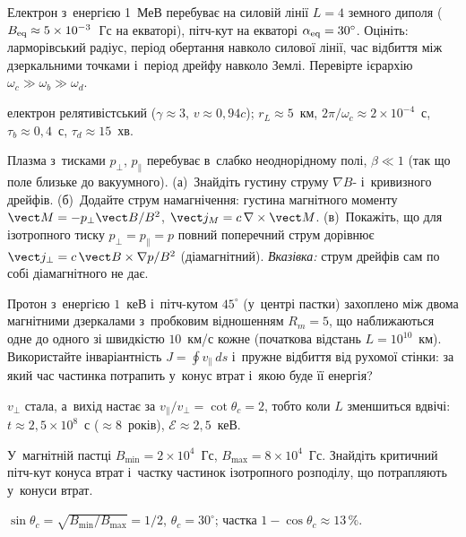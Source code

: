 \begin{problem}\label{prb:DipoleBelts}
	Електрон з~енергією 1~МеВ перебуває на силовій лінії $L=4$ земного диполя ($B_{\rm eq}\approx5\times10^{-3}$~Гс на екваторі),
	пітч-кут на екваторі $\alpha_{\rm eq}=30^\circ$. Оцініть: ларморівський радіус, період обертання
	навколо силової лінії, час відбиття між дзеркальними точками і~період дрейфу навколо Землі.
	Перевірте ієрархію $\omega_c\gg\omega_b\gg\omega_d$.
	\begin{solution}
		електрон релятивістський ($\gamma\approx3$, $v\approx0{,}94c$); $r_L\approx5$~км,
	$2\pi/\omega_c\approx2\times10^{-4}$~с, $\tau_b\approx0{,}4$~с, $\tau_d\approx15$~хв.
	\end{solution}
\end{problem}

\begin{problem}\label{prb:DriftCurrent}
	Плазма з~тисками $p_\perp$, $p_\parallel$ перебуває в~слабко неоднорідному полі, $\beta\ll1$
	(так що поле близьке до вакуумного). (а)~Знайдіть густину струму $\nabla B$- і~кривизного дрейфів.
	(б)~Додайте струм намагнічення: густина магнітного моменту $\vect M=-p_\perp\vect B/B^2$,
	$\vect j_M=c\,\nabla\times\vect M$. (в)~Покажіть, що для ізотропного тиску $p_\perp=p_\parallel=p$
	повний поперечний струм дорівнює $\vect j_\perp=c\,\vect B\times\nabla p/B^2$ (діамагнітний).
	\emph{Вказівка:} струм дрейфів сам по собі діамагнітного не дає.
\end{problem}

\begin{problem}\label{prb:FermiAcceleration}
	Протон з~енергією $1$~кеВ і~пітч-кутом $45^\circ$ (у~центрі пастки) захоплено між двома магнітними дзеркалами з~пробковим відношенням $R_m=5$,
	що наближаються одне до одного зі швидкістю $10$~км/с кожне (початкова відстань $L=10^{10}$~км).
	Використайте інваріантність $J=\oint v_\parallel\,ds$ і~пружне відбиття від рухомої стінки: за який час частинка потрапить у~конус втрат
	і~якою буде її енергія?
	\begin{solution}
		$v_\perp$ стала, а~вихід настає за $v_\parallel/v_\perp=\cot\theta_c=2$, тобто коли $L$ зменшиться вдвічі:
	$t\approx2{,}5\times10^8$~с ($\approx8$~років), $\mathcal E\approx2{,}5$~кеВ.
	\end{solution}
\end{problem}

\begin{problem}\label{prb:PlasmaMirror}
	У~магнітній пастці $B_{\min}=2\times10^4$~Гс, $B_{\max}=8\times10^4$~Гс. Знайдіть
	критичний пітч-кут конуса втрат і~частку частинок ізотропного розподілу, що
	потрапляють у~конуси втрат.
	\begin{solution}
		$\sin\theta_c=\sqrt{B_{\min}/B_{\max}}=1/2$, $\theta_c=30^\circ$; частка $1-\cos\theta_c\approx13\,\%$.
	\end{solution}
\end{problem}

